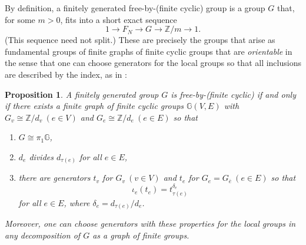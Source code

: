 \documentclass[11pt, a4 paper]{amsart}
\numberwithin{equation}{section}
\newtheorem{proposition}[theorem]{Proposition}
\theoremstyle{remark}
\theoremstyle{definition}
\def\Z{\mathbb Z}
\def\-{\overline}
\def\GG{\mathbb{G}}
\def\t{\tau}
\def\-{\overline}
\begin{document}
By definition, a finitely generated free-by-(finite cyclic) group 
is a group $G$ that, for some $m>0$, 
fits into a short exact sequence 
\begin{equation}
\label{e:seq}
	1\to F_N \to G \to \Z/m \to 1.
\end{equation}
(This sequence need not split.)
These are precisely the groups that arise as 
fundamental groups of finite graphs of finite cyclic groups 
that are {\em orientable} in the sense that 
one can choose generators for the local groups   
so that all inclusions are described by the index, 
as in : 

\begin{proposition}
\label{which_graphs} 
	A finitely generated group $G$ is free-by-(finite cyclic)
	if and only if there exists 
	a finite graph of finite cyclic groups $\GG(V,E)$ with 
	$G_v\cong \Z/d_v\ (e\in V)$ and 
	$G_e\cong \Z/d_e\ (e\in E)$ so that 
	\begin{enumerate}
		\item $G\cong\pi_1\GG$,
		\item $d_e$ divides $d_{\tau(e)}$ for all $e\in E$,
		\item there are generators $t_v$ for $G_v\ (v\in V)$ 
		and $t_e$ for $G_e=G_{\-e}\ (e\in E)$ so that 
		$$\iota_e(t_e) = t_{\t(e)}^{\delta_e}$$ 
		for all $e\in E$, where $\delta_e = d_{\tau(e)}/d_e$. 
	\end{enumerate} 
	Moreover, one can choose generators with these properties 
	for the local groups in any decomposition of $G$ 
	as a graph of finite groups. 
\end{proposition}
\end{document}
